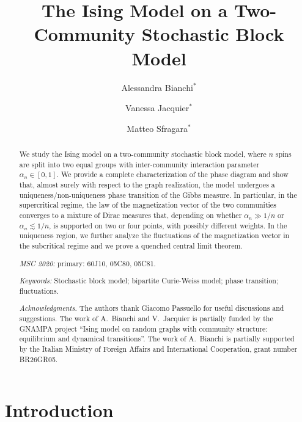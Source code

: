 \documentclass[11pt,oneside]{amsart}
\title[Ising on 2-community SBM]{The Ising Model on a Two-Community Stochastic Block Model
}
\author{Alessandra Bianchi$^{*}$}
\author{Vanessa Jacquier$^{*}$}
\author{Matteo Sfragara$^{*}$}
\numberwithin{equation}{section}  %
\theoremstyle{plain}
\theoremstyle{remark}
\begin{document}
	\begin{abstract}
We study the Ising model on a two-community stochastic block model, where $n$ spins are split into two equal groups with inter-community interaction parameter $\alpha_n\in[0,1]$. We provide a complete characterization of the phase diagram and show that, almost surely with respect to the graph realization, the model undergoes a uniqueness/non-uniqueness phase transition of the Gibbs measure. In particular, in the supercritical regime, the law of the magnetization vector of the two communities converges to a mixture of Dirac measures that, depending on whether $\alpha_n\gg 1/n$ or $\alpha_n\lesssim1/n$, is supported on two or four points, with possibly different weights. In the uniqueness region, we further analyze the fluctuations of the magnetization vector in the subcritical regime and we prove a quenched central limit theorem.

   \par\bigskip\noindent
   {\it MSC 2020:} primary:  60J10, 05C80, 05C81.
   \par\smallskip\noindent
   {\it Keywords:}  Stochastic block model; bipartite Curie-Weiss model; phase transition; fluctuations.\\

    \par\smallskip\noindent
    {\it Acknowledgments.} 
    The authors thank Giacomo Passuello for useful discussions and suggestions. 
    The work of A.~Bianchi and V.~Jacquier is partially funded by the GNAMPA project ``Ising model on random graphs with community structure: equilibrium and dynamical transitions''.
    The work of A.~Bianchi is partially supported by the Italian Ministry of Foreign Affairs and International Cooperation, grant number BR26GR05. 	
	\end{abstract}

\maketitle
\begingroup
\renewcommand{\thefootnote}{\fnsymbol{footnote}}
\endgroup


\section{Introduction}\label{sec:intro}
\end{document}
